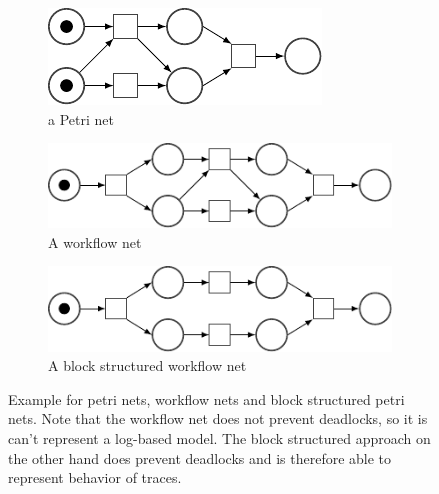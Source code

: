 \documentclass[
	a4paper,
	pagesize,
	pdftex,
	12pt,
	twoside, %
	BCOR=5mm, %
	ngerman,
	fleqn,
	final,
	]{scrartcl}
\begin{document}
\begin{figure}[h]
	\begin{subfigure}[t]{.32\textwidth}
	  \centering
	  \includegraphics[width=0.7\linewidth]{img/petri_deadlock.pdf}
	  \caption{a Petri net}
	  \label{fig:petrinet}
	\end{subfigure}
	\begin{subfigure}[t]{.32\textwidth}
	  \centering
	  \includegraphics[width=\linewidth]{img/wfnet.pdf}
	  \caption{A workflow net}
	  \label{fig:workflownet}
	\end{subfigure}
	\begin{subfigure}[t]{.32\textwidth}
	  \centering
	  	  \includegraphics[width=\linewidth]{img/bswfnet.pdf}
	  \caption{A block structured workflow net}
	  \label{fig:blockstructuredworkflownet}
	\end{subfigure}
\caption{Example for petri nets, workflow nets and block structured petri nets. Note that the workflow net does not prevent deadlocks, so it is can't represent a log-based model. The block structured approach on the other hand does prevent deadlocks and is therefore able to represent behavior of traces.}
\label{fig:petri-nets}
\end{figure}
\end{document}
